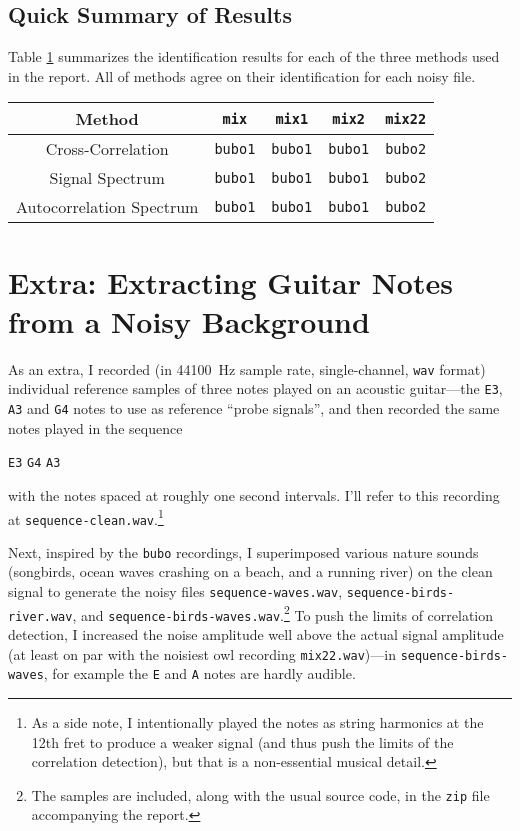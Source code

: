 \documentclass[11pt, a4paper]{article}
\begin{document}
\subsection{Quick Summary of Results}
Table \ref{fft:table:results} summarizes the identification results for each of the three methods used in the report. All of methods agree on their identification for each noisy file. 
\begin{table}[h]
\centering
\begin{tabular}{c|cccc}
    Method & \texttt{mix} & \texttt{mix1} & \texttt{mix2} & \texttt{mix22} \\
    \hline
    Cross-Correlation & \texttt{bubo1} & \texttt{bubo1} & \texttt{bubo1} & \texttt{bubo2}\\
    Signal Spectrum & \texttt{bubo1} & \texttt{bubo1} & \texttt{bubo1} & \texttt{bubo2}\\
    Autocorrelation Spectrum & \texttt{bubo1} & \texttt{bubo1} & \texttt{bubo1} & \texttt{bubo2}
\end{tabular}
\label{fft:table:results}

\end{table}

\section{Extra: Extracting Guitar Notes from a Noisy Background}
As an extra, I recorded (in \SI{44100}{\hertz} sample rate, single-channel, \texttt{wav} format) individual reference samples of three notes played on an acoustic guitar---the \texttt{E3}, \texttt{A3} and \texttt{G4} notes to use as reference ``probe signals'', and then recorded the same notes played in the sequence 
\begin{center}
	\texttt{E3} \qquad \texttt{G4} \qquad  \texttt{A3}
\end{center}
with the notes spaced at roughly one second intervals. I'll refer to this recording at \texttt{sequence-clean.wav}.\footnote{As a side note, I intentionally played the notes as string harmonics at the 12th fret to produce a weaker signal (and thus push the limits of the correlation detection), but that is a non-essential musical detail.} 

Next, inspired by the \texttt{bubo} recordings, I superimposed various nature sounds (songbirds, ocean waves crashing on a beach, and a running river) on the clean signal to generate the noisy files \texttt{sequence-waves.wav}, \texttt{sequence-birds-river.wav}, and \texttt{sequence-birds-waves.wav}.\footnote{The samples are included, along with the usual source code, in the \texttt{zip} file accompanying the report.} To push the limits of correlation detection, I increased the noise amplitude well above the actual signal amplitude (at least on par with the noisiest owl recording \texttt{mix22.wav})---in \texttt{sequence-birds-waves}, for example the \texttt{E} and \texttt{A} notes are hardly audible.
\end{document}
